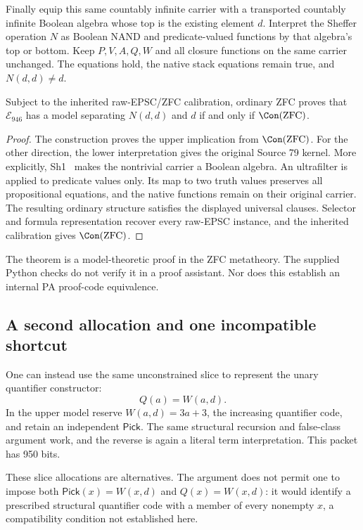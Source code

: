 Finally equip this same countably infinite carrier with a transported
countably infinite Boolean algebra whose top is the existing element $d$.
Interpret the Sheffer operation $N$ as Boolean NAND and predicate-valued
functions by that algebra's top or bottom. Keep $P,V,A,Q,W$ and all closure
functions on the same carrier unchanged. The equations hold, the native
stack equations remain true, and $N(d,d)\ne d$.

\begin{theorem}
Subject to the inherited raw-EPSC/ZFC calibration,
ordinary ZFC proves that $\mathcal E_{946}$ has a model separating
$N(d,d)$ and $d$ if and only if $\Con(\mathrm{ZFC})$.
\end{theorem}
\begin{proof}
The construction proves the upper implication from $\Con(\mathrm{ZFC})$.
For the other direction, the lower interpretation gives the original
Source 79 kernel. More explicitly, Sh1~\cite{sh1} makes the nontrivial
carrier a Boolean algebra. An ultrafilter is applied to predicate values
only. Its map to two truth values preserves all propositional equations,
and the native functions remain on their original carrier. The resulting
ordinary structure satisfies the displayed universal clauses. Selector and
formula representation recover every raw-EPSC instance, and the inherited
calibration gives $\Con(\mathrm{ZFC})$.
\end{proof}

The theorem is a model-theoretic proof in the ZFC metatheory. The supplied
Python checks do not verify it in a proof assistant. Nor does this establish
an internal PA proof-code equivalence.

\subsection{A second allocation and one incompatible shortcut}

One can instead use the same unconstrained slice to represent the unary
quantifier constructor:
\[
                  Q(a)=W(a,d).
\]
In the upper model reserve $W(a,d)=3a+3$, the increasing quantifier code,
and retain an independent $\mathsf{Pick}$. The same structural recursion
and false-class argument work, and the reverse is again a literal term
interpretation. This packet has 950 bits.

These slice allocations are alternatives. The argument does not permit
one to impose both $\mathsf{Pick}(x)=W(x,d)$ and $Q(x)=W(x,d)$: it would
identify a prescribed structural quantifier code with a member of every
nonempty $x$, a compatibility condition not established here.

